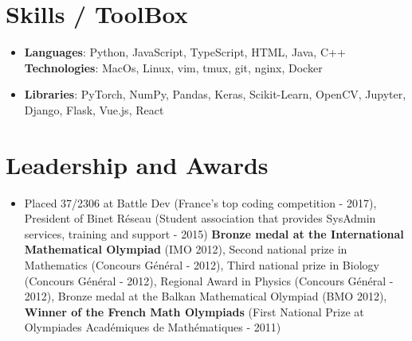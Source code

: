 \documentclass[letterpaper,10pt]{article}
\newcommand{\resumeSubHeadingListStart}{\begin{itemize}[leftmargin=*]}
\newcommand{\resumeSubHeadingListEnd}{\end{itemize}}
\newcommand{\shorterSection}[1]{\vspace{-10pt}\section{#1}}
\begin{document}
\shorterSection{Skills / ToolBox}
  \resumeSubHeadingListStart
  \small
    \item{
     \textbf{Languages}{: Python, JavaScript, TypeScript, HTML, Java, C++}
     \hfill
     \textbf{Technologies}{: MacOs, Linux, vim, tmux, git, nginx, Docker}
    }
    \vspace{-5pt}
    \item{
     \textbf{Libraries}{: PyTorch, NumPy, Pandas, Keras, Scikit-Learn, OpenCV, Jupyter, Django, Flask, Vue.js, React}
    }
\resumeSubHeadingListEnd
\shorterSection{Leadership and Awards}
  \resumeSubHeadingListStart
    \item[]\small{
        {Placed 37/2306 at Battle Dev (France's top coding competition - 2017), President of Binet Réseau (Student association that provides SysAdmin services, training and support - 2015) \textbf{Bronze medal at the International Mathematical Olympiad} (IMO 2012), Second national prize in Mathematics (Concours Général - 2012),  Third national prize in Biology (Concours Général - 2012),  Regional Award in Physics (Concours Général - 2012), Bronze medal at the Balkan Mathematical Olympiad (BMO 2012), \textbf{Winner of the French Math Olympiads} (First National Prize at Olympiades Académiques de Mathématiques - 2011)  \vspace{-6pt}}
    }
  \resumeSubHeadingListEnd
\end{document}
